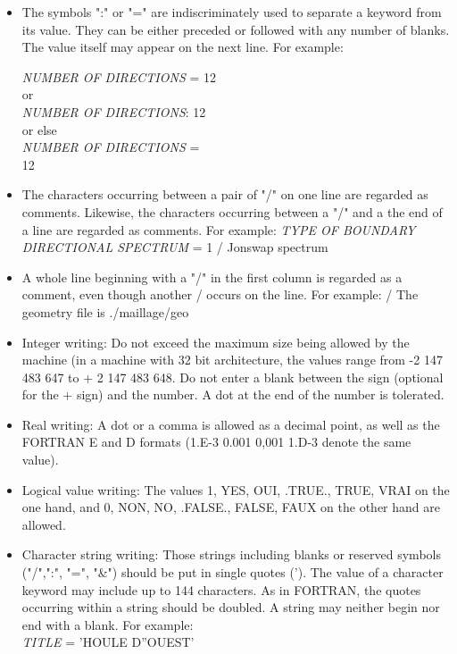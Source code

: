\begin{itemize}
\item  The symbols ":" or "=" are indiscriminately used to separate a keyword from its value. They can be either preceded or followed with any number of blanks. The value itself may appear on the next line. For example:    

\textit{NUMBER OF DIRECTIONS} = 12\\
    or \\   \textit{NUMBER OF DIRECTIONS}: 12 \\  or else \\  \textit{NUMBER OF DIRECTIONS} =\\   12

\item  The characters occurring between a pair of "/" on one line are regarded as comments. Likewise, the characters occurring between a "/" and a the end of a line are regarded as comments. For example:  \textit{TYPE OF BOUNDARY DIRECTIONAL SPECTRUM }= 1 / Jonswap spectrum

\item  A whole line beginning with a "/" in the first column is regarded as a comment, even though another / occurs on the line. For example:  / The geometry file is ./maillage/geo

\item  Integer writing: Do not exceed the maximum size being allowed by the machine (in a machine with 32 bit architecture, the values range from -2 147 483 647 to + 2 147 483 648. Do not enter a blank between the sign (optional for the + sign) and the number. A dot at the end of the number is tolerated.

\item  Real writing: A dot or a comma is allowed as a decimal point, as well as the FORTRAN E and D formats (1.E-3 0.001 0,001 1.D-3 denote the same value).

\item  Logical value writing: The values 1, YES, OUI, .TRUE., TRUE, VRAI on the one hand, and 0, NON, NO, .FALSE., FALSE, FAUX on the other hand are allowed.

\item  Character string writing: Those strings including blanks or reserved symbols ("/",":", "=", "\&") should be put in single quotes ('). The value of a character keyword may include up to 144 characters. As in FORTRAN, the quotes occurring within a string should be doubled. A string may neither begin nor end with a blank. For example:   \\
\textit{TITLE} = 'HOULE D''OUEST'
\end{itemize}

